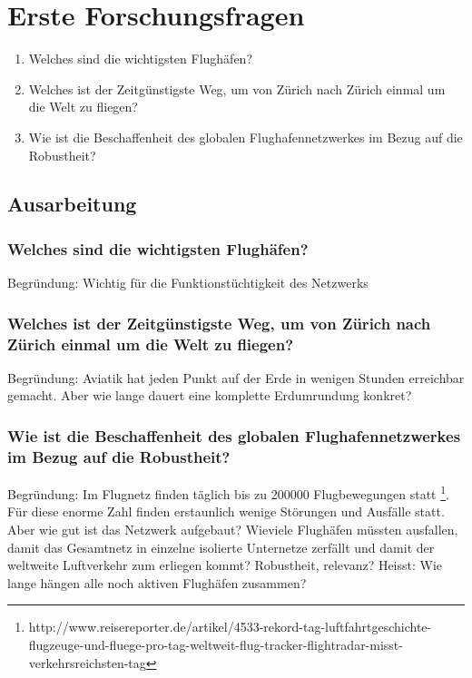 \section{Erste Forschungsfragen}
\label{sub:scientific-questions}

\begin{enumerate}
    \item Welches sind die wichtigsten Flughäfen?
    \item Welches ist der Zeitgünstigste Weg, um von Zürich nach Zürich einmal um die Welt zu fliegen?
    \item Wie ist die Beschaffenheit des globalen Flughafennetzwerkes im Bezug auf die Robustheit?
\end{enumerate}

\subsection{Ausarbeitung}
\label{subsec:scientific-question-analysis}


\subsubsection{Welches sind die wichtigsten Flughäfen?}
Begründung: Wichtig für die Funktionstüchtigkeit des Netzwerks

\subsubsection{Welches ist der Zeitgünstigste Weg, um von Zürich nach Zürich einmal um die Welt zu fliegen?}
Begründung: Aviatik hat jeden Punkt auf der Erde in wenigen Stunden erreichbar gemacht. Aber wie lange dauert eine komplette Erdumrundung konkret?

\subsubsection{Wie ist die Beschaffenheit des globalen Flughafennetzwerkes im Bezug auf die Robustheit?}
Begründung: Im Flugnetz finden täglich bis zu 200000 Flugbewegungen statt \footnote{http://www.reisereporter.de/artikel/4533-rekord-tag-luftfahrtgeschichte-flugzeuge-und-fluege-pro-tag-weltweit-flug-tracker-flightradar-misst-verkehrsreichsten-tag}.
Für diese enorme Zahl finden erstaunlich wenige Störungen und Ausfälle statt.
Aber wie gut ist das Netzwerk aufgebaut?
Wieviele Flughäfen müssten ausfallen, damit das Gesamtnetz in einzelne isolierte Unternetze zerfällt und damit der weltweite Luftverkehr zum erliegen kommt?
Robustheit, relevanz? Heisst: Wie lange hängen alle noch aktiven Flughäfen zusammen?

